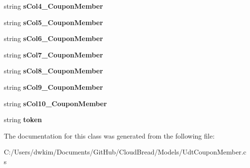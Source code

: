 \begin{DoxyCompactItemize}
\item 
string {\bfseries s\+Col4\+\_\+\+Coupon\+Member}\hypertarget{a00109_a5d6be0e4fa681d2a0ce8bd3096ae1046}{}\label{a00109_a5d6be0e4fa681d2a0ce8bd3096ae1046}

\item 
string {\bfseries s\+Col5\+\_\+\+Coupon\+Member}\hypertarget{a00109_a2cc9f6be25ef4df808e5d220b0af75d9}{}\label{a00109_a2cc9f6be25ef4df808e5d220b0af75d9}

\item 
string {\bfseries s\+Col6\+\_\+\+Coupon\+Member}\hypertarget{a00109_a8751f0a3f290f51a3736102041fac5f3}{}\label{a00109_a8751f0a3f290f51a3736102041fac5f3}

\item 
string {\bfseries s\+Col7\+\_\+\+Coupon\+Member}\hypertarget{a00109_a43e5ad0c44aac0b2152240d0d8125abb}{}\label{a00109_a43e5ad0c44aac0b2152240d0d8125abb}

\item 
string {\bfseries s\+Col8\+\_\+\+Coupon\+Member}\hypertarget{a00109_a05cc6b2d5bc794f58cd06e77b19bb9dc}{}\label{a00109_a05cc6b2d5bc794f58cd06e77b19bb9dc}

\item 
string {\bfseries s\+Col9\+\_\+\+Coupon\+Member}\hypertarget{a00109_ade001e8305efcaa5776452c6496b874f}{}\label{a00109_ade001e8305efcaa5776452c6496b874f}

\item 
string {\bfseries s\+Col10\+\_\+\+Coupon\+Member}\hypertarget{a00109_a8d32fba0b33a3a807059d75c508d2d42}{}\label{a00109_a8d32fba0b33a3a807059d75c508d2d42}

\item 
string {\bfseries token}\hypertarget{a00109_a2f3bb981993c7a2a9e0e09dabd07e3ec}{}\label{a00109_a2f3bb981993c7a2a9e0e09dabd07e3ec}

\end{DoxyCompactItemize}


The documentation for this class was generated from the following file\+:\begin{DoxyCompactItemize}
\item 
C\+:/\+Users/dwkim/\+Documents/\+Git\+Hub/\+Cloud\+Bread/\+Models/Udt\+Coupon\+Member.\+cs\end{DoxyCompactItemize}
